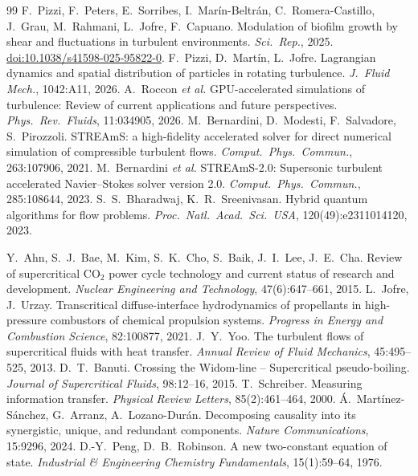 \documentclass[11pt]{article}
\begin{document}
\begin{thebibliography}{99}
 F.\ Pizzi, F.\ Peters, E.\ Sorribes, I.\ Mar\'in-Beltr\'an, C.\ Romera-Castillo, J.\ Grau, M.\ Rahmani, L.\ Jofre, F.\ Capuano. Modulation of biofilm growth by shear and fluctuations in turbulent environments. \emph{Sci.\ Rep.}, 2025. \href{https://doi.org/10.1038/s41598-025-95822-0}{doi:10.1038/s41598-025-95822-0}.
 F.\ Pizzi, D.\ Mart\'in, L.\ Jofre. Lagrangian dynamics and spatial distribution of particles in rotating turbulence. \emph{J.\ Fluid Mech.}, 1042:A11, 2026.
 A.\ Roccon \emph{et al.} GPU-accelerated simulations of turbulence: Review of current applications and future perspectives. \emph{Phys.\ Rev.\ Fluids}, 11:034905, 2026.
 M.\ Bernardini, D.\ Modesti, F.\ Salvadore, S.\ Pirozzoli. STREAmS: a high-fidelity accelerated solver for direct numerical simulation of compressible turbulent flows. \emph{Comput.\ Phys.\ Commun.}, 263:107906, 2021.
 M.\ Bernardini \emph{et al.} STREAmS-2.0: Supersonic turbulent accelerated Navier--Stokes solver version 2.0. \emph{Comput.\ Phys.\ Commun.}, 285:108644, 2023.
 S.\ S.\ Bharadwaj, K.\ R.\ Sreenivasan. Hybrid quantum algorithms for flow problems. \emph{Proc.\ Natl.\ Acad.\ Sci.\ USA}, 120(49):e2311014120, 2023.
 Y.\ Ahn, S.\ J.\ Bae, M.\ Kim, S.\ K.\ Cho, S.\ Baik, J.\ I.\ Lee, J.\ E.\ Cha.
Review of supercritical CO$_2$ power cycle technology and current status of research and
development. \emph{Nuclear Engineering and Technology}, 47(6):647--661, 2015.
 L.\ Jofre, J.\ Urzay. Transcritical diffuse-interface hydrodynamics
of propellants in high-pressure combustors of chemical propulsion systems. \emph{Progress
in Energy and Combustion Science}, 82:100877, 2021.
 J.\ Y.\ Yoo. The turbulent flows of supercritical fluids with heat
transfer. \emph{Annual Review of Fluid Mechanics}, 45:495--525, 2013.
 D.\ T.\ Banuti. Crossing the Widom-line -- Supercritical pseudo-boiling.
\emph{Journal of Supercritical Fluids}, 98:12--16, 2015.
 T.\ Schreiber. Measuring information transfer. \emph{Physical Review
Letters}, 85(2):461--464, 2000.
 \'A.\ Mart\'inez-S\'anchez, G.\ Arranz, A.\ Lozano-Dur\'an.
Decomposing causality into its synergistic, unique, and redundant components. \emph{Nature
Communications}, 15:9296, 2024.
 D.-Y.\ Peng, D.\ B.\ Robinson. A new two-constant equation of
state. \emph{Industrial \& Engineering Chemistry Fundamentals}, 15(1):59--64, 1976.

\end{thebibliography}
\end{document}

